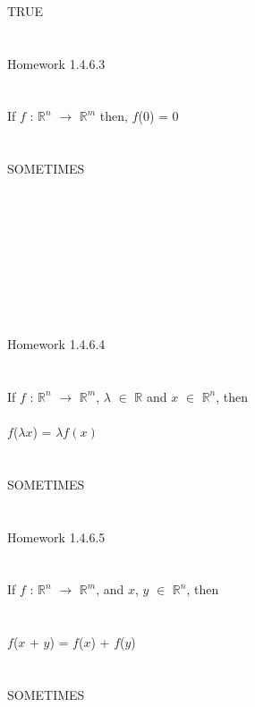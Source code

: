 \documentclass[11pt]{article}
\begin{document}
\\
\\
\\
TRUE
\\
\\
\\
Homework 1.4.6.3
\\
\\
\\
If $f$ : $\mathbb{R}^n$ $\rightarrow$ $\mathbb{R}^m$ then,
$f$(0) = 0
\\
\\
\\
SOMETIMES
\\
\\
\\
\\
\\
\\
\\
\\
\\
\\
Homework 1.4.6.4
\\
\\
\\
If $f$ : $\mathbb{R}^n$ $\rightarrow$ $\mathbb{R}^m$, $\lambda$ $\in$ $\mathbb{R}$ and $x$ $\in$ $\mathbb{R}^n$, then
\\
\\
$f$($\lambda x$) = $\lambda f(x)$
\\
\\
\\
SOMETIMES
\\
\\
\\
Homework 1.4.6.5
\\
\\
\\
If $f$ : $\mathbb{R}^n$ $\rightarrow$ $\mathbb{R}^m$, and $x$, $y$ $\in$ $\mathbb{R}^n$, then
\\
\\
\\
$f$($x$ + $y$) = $f$($x$) + $f$($y$)
\\
\\
\\
SOMETIMES
\end{document}
